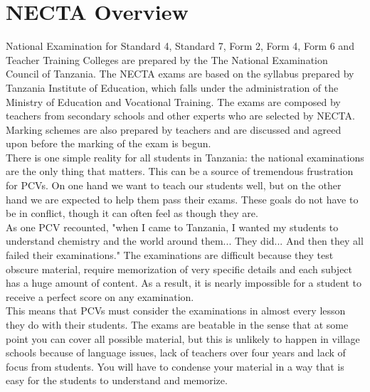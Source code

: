 \section{NECTA Overview}

     National Examination for Standard 4, Standard 7, Form 2, Form 4, Form 6 and Teacher Training Colleges are prepared by the The National Examination Council of Tanzania.  The NECTA exams are based on the syllabus prepared by Tanzania Institute of Education, which falls under the administration of the Ministry of Education and Vocational Training. The exams are composed by teachers from secondary schools and other experts who are selected by NECTA. Marking schemes are also prepared by teachers and are discussed and agreed upon before the marking of the exam is begun. \\
      There is one simple reality for all students in Tanzania: the national examinations are the only thing that matters.  This can be a source of tremendous frustration for PCVs.  On one hand we want to teach our students well, but on the other hand we are expected to help them pass their exams.  These goals do not have to be in conflict, though it can often feel as though they are.\\   

      As one PCV recounted, "when I came to Tanzania, I wanted my students to understand chemistry and the world around them...  They did...  And then they all failed their examinations."  The examinations are difficult because they test obscure material, require memorization of very specific details and each subject has a huge amount of content.  As a result, it is nearly impossible for a student to receive a perfect score on any examination.   \\

      This means that PCVs must consider the examinations in almost every lesson they do with their students.  The exams are beatable in the sense that at some point you can cover all possible material, but this is unlikely to happen in village schools because of language issues, lack of teachers over four years and lack of focus from students.  You will have to condense your material in a way that is easy for the students to understand and memorize. 

